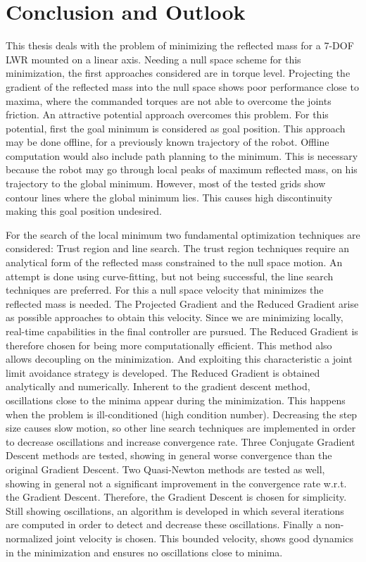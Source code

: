 \chapter{Conclusion and Outlook}
\label{ch:conclusion}


This thesis deals with the problem of minimizing the reflected mass for a 7-DOF LWR mounted on a linear axis. Needing a null space scheme for this minimization, the first approaches considered are in torque level. Projecting the gradient of the reflected mass into the null space shows poor performance close to maxima, where the commanded torques are not able to overcome the joints friction. An attractive potential approach overcomes this problem. For this potential, first the goal minimum is considered as goal position. This approach may be done offline, for a previously known trajectory of the robot. Offline computation would also include path planning to the minimum. This is necessary because the robot may go through local peaks of maximum reflected mass, on his trajectory to the global minimum. However, most of the tested grids show contour lines where the global minimum lies. This causes high discontinuity making this goal position undesired. 

For the search of the local minimum two fundamental optimization techniques are considered: Trust region and line search. The trust region techniques require an analytical form of the reflected mass constrained to the null space motion. An attempt is done using curve-fitting, but not being successful, the line search techniques are preferred. For this a null space velocity that minimizes the reflected mass is needed. The Projected Gradient and the Reduced Gradient arise as possible approaches to obtain this velocity. Since we are minimizing locally, real-time capabilities in the final controller are pursued. The Reduced Gradient is therefore chosen for being more computationally efficient. This method also allows decoupling on the minimization. And exploiting this characteristic a joint limit avoidance strategy is developed.  The Reduced Gradient is obtained analytically and numerically. Inherent to the gradient descent method, oscillations close to the minima appear during the minimization. This happens when the problem is ill-conditioned (high condition number). Decreasing the step size causes slow motion, so other line search techniques are implemented in order to decrease oscillations and increase convergence rate. Three Conjugate Gradient Descent methods are tested, showing in general worse convergence than the original Gradient Descent. Two Quasi-Newton methods are tested as well, showing in general not a significant improvement in the convergence rate w.r.t. the Gradient Descent. Therefore, the Gradient Descent is chosen for simplicity. Still showing oscillations, an algorithm is developed in which several iterations are computed in order to detect and decrease these oscillations. Finally a  non-normalized joint velocity is chosen. This bounded velocity,  shows good dynamics in the minimization and ensures no oscillations close to minima.

